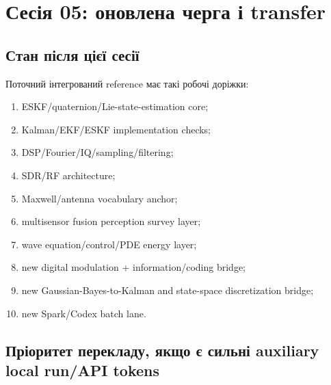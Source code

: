 \chapter{Сесія 05: оновлена черга і transfer}
\label{ch:session05-queue-transfer}

\section{Стан після цієї сесії}

Поточний інтегрований reference має такі робочі доріжки:
\begin{enumerate}[label=\arabic*.]
\item ESKF/quaternion/Lie-state-estimation core;
\item Kalman/EKF/ESKF implementation checks;
\item DSP/Fourier/IQ/sampling/filtering;
\item SDR/RF architecture;
\item Maxwell/antenna vocabulary anchor;
\item multisensor fusion perception survey layer;
\item wave equation/control/PDE energy layer;
\item new digital modulation + information/coding bridge;
\item new Gaussian-Bayes-to-Kalman and state-space discretization bridge;
\item new Spark/Codex batch lane.
\end{enumerate}

\section{Пріоритет перекладу, якщо є сильні auxiliary local run/API tokens}

